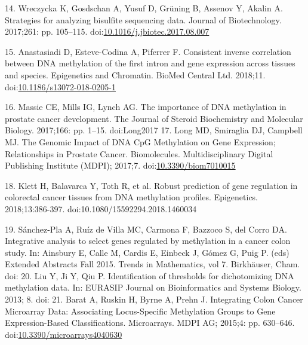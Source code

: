 \documentclass[10pt,letterpaper]{article}
\begin{document}
\leavevmode\hypertarget{ref-Wreczycka2017}{}%
14. Wreczycka K, Gosdschan A, Yusuf D, Grüning B, Assenov Y, Akalin A.
Strategies for analyzing bisulfite sequencing data. Journal of
Biotechnology. 2017;261: pp. 105--115.
doi:\href{https://doi.org/10.1016/j.jbiotec.2017.08.007}{10.1016/j.jbiotec.2017.08.007}

\leavevmode\hypertarget{ref-Anastasiadi2018}{}%
15. Anastasiadi D, Esteve-Codina A, Piferrer F. Consistent inverse
correlation between DNA methylation of the first intron and gene
expression across tissues and species. Epigenetics and Chromatin. BioMed
Central Ltd. 2018;11.
doi:\href{https://doi.org/10.1186/s13072-018-0205-1}{10.1186/s13072-018-0205-1}

\leavevmode\hypertarget{ref-Massie2017}{}%
16. Massie CE, Mills IG, Lynch AG. The importance of DNA methylation in prostate
cancer development. The Journal of Steroid Biochemistry and Molecular Biology. 
2017;166: pp. 1--15.
doi:\href{https://doi.org/10.1016/j.jsbmb.2016.04.009}

\leavevmode\hypertarget{ref-}{Long2017}%
17. Long MD, Smiraglia DJ, Campbell MJ. The Genomic Impact of DNA CpG
Methylation on Gene Expression; Relationships in Prostate Cancer.
Biomolecules. Multidisciplinary Digital Publishing Institute (MDPI);
2017;7.
doi:\href{https://doi.org/10.3390/biom7010015}{10.3390/biom7010015}

\leavevmode\hypertarget{ref-Klett2018}{}%
18. Klett H, Balavarca Y, Toth R, et al. Robust prediction of gene regulation 
in colorectal cancer tissues from DNA methylation profiles. Epigenetics. 
2018;13:386-397. doi:10.1080/15592294.2018.1460034

\leavevmode\hypertarget{ref-Sanchez-Pla2017}{}%
19. Sánchez-Pla A, Ruíz de Villa MC, Carmona F, Bazzoco S, del Corro DA. 
Integrative analysis to select genes regulated by methylation in a cancer colon 
study. In: Ainsbury E, Calle M, Cardis E, Einbeck J, Gómez G, Puig P. (eds)
Extended Abstracts Fall 2015. Trends in Mathematics, vol 7. Birkhäuser, 
Cham. doi: \href{https://doi.org/10.1007/978-3-319-55639-0_9}

\leavevmode\hypertarget{ref-Liu2013}{}%
20. Liu Y, Ji Y, Qiu P. Identification of thresholds for dichotomizing DNA 
methylation data. In: EURASIP Journal on Bioinformatics and Systems Biology. 
2013; 8. doi: \href{http://bsb.eurasipjournals.com/content/2013/1/8}

\leavevmode\hypertarget{ref-Barat2015}{}%
21. Barat A, Ruskin H, Byrne A, Prehn J. Integrating Colon Cancer
Microarray Data: Associating Locus-Specific Methylation Groups to Gene
Expression-Based Classifications. Microarrays. MDPI AG; 2015;4:
pp. 630--646.
doi:\href{https://doi.org/10.3390/microarrays4040630}{10.3390/microarrays4040630}
\end{document}
